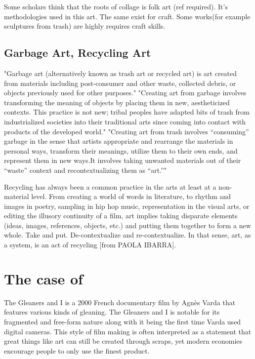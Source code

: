 Some scholars think that the roots of collage is folk art (ref required). It's methodologies used in this art. The same exist for craft. Some works(for example sculptures from trash) are highly requires craft skills.

\subsection{Garbage Art, Recycling Art}
"Garbage art (alternatively known as trash art or recycled art) is art created from materials including post-consumer and other waste, collected debris, or objects previously used for other purposes." "Creating art from garbage involves transforming the meaning of objects by placing them in new, aestheticized contexts. This practice is not new; tribal peoples have adapted bits of trash from industrialized societies into their traditional arts since coming into contact with products of the developed world." "Creating art from trash involves “consuming” garbage in the sense that artists appropriate and rearrange the materials in personal ways, transform their meanings, utilize them to their own ends, and represent them in new ways.It involves taking unwanted materials out of their “waste” context and recontextualizing them as “art.”" \cite{tauxe2012encyclopedia}

Recycling has always been a common practice in the arts at least at a non-material level. From creating a world of words in literature, to rhythm and images in poetry, sampling in hip hop music, representation in the visual arts, or editing the illusory continuity of a film, art implies taking disparate elements (ideas, images, references, objects, etc.) and putting them together to form a new whole. Take and put. De-contextualize and re-contextualize. In that sense, art, as a system, is an act of recycling [from PAOLA IBARRA].


\section{The case of }
The Gleaners and I is a 2000 French documentary film by Agnès Varda that features various kinds of gleaning. The Gleaners and I is notable for its fragmented and free-form nature along with it being the first time Varda used digital cameras. This style of film making is often interpreted as a statement that great things like art can still be created through scraps, yet modern economies encourage people to only use the finest product.

